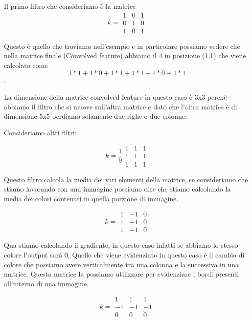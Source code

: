 \documentclass[14pt]{extreport}
\begin{document}
Il primo filtro che consideriamo è la matrice 
\begin{equation}
	k = \begin{matrix}
1 & 0 & 1\\
0 & 1 & 0\\
1 & 0 & 1
\end{matrix}
\end{equation}

Questo è quello che troviamo nell'esempio e in particolare possiamo vedere che nella matrice finale (Convolved feature) abbiamo il 4 in posizione
(1,1) che viene calcolato come
$$1*1+1*0+1*1+1*1+1*0+1*1$$.

La dimensione della matrice convolved feature in questo caso è 3x3 perchè abbiamo il filtro che si muove sull'altra matrice e dato che l'altra matrice
è di dimensione 5x5 perdiamo solamente due righe e due colonne.

Consideriamo altri filtri:

\begin{equation}
	k = \frac{1}{9}\begin{matrix}
1 & 1 & 1\\
1 & 1 & 1\\
1 & 1 & 1
\end{matrix}
\end{equation}

Questo filtro calcola la media dei vari elementi della matrice, se consideriamo che stiamo lavorando con una immagine possiamo dire che stiamo
calcolando la media dei colori contenuti in quella porzione di immagine.


\begin{equation}
	k = \begin{matrix}
1 & -1 & 0\\
1 & -1 & 0\\
1 & -1 & 0
\end{matrix}
\end{equation}

Qua stiamo calcolando il gradiente, in questo caso infatti se abbiamo lo stesso colore l'output sarà 0. Quello che viene evidenziato in questo caso è
il cambio di colore che possiamo avere verticalmente tra una colonna e la successiva in una matrice. Questa matrice la possiamo utilizzare per
evidenziare i bordi presenti all'interno di una immagine.

\begin{equation}
	k = \begin{matrix}
1 & 1 & 1\\
-1 & -1 & -1\\
0 & 0 & 0
\end{matrix}
\end{equation}
\end{document}
